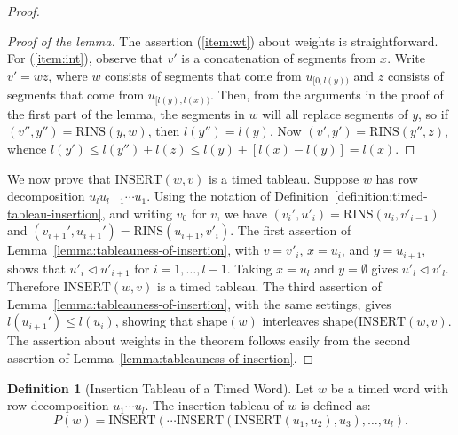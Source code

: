 \documentclass[10pt]{amsproc}
\theoremstyle{definition}
\newtheorem{definition}[theorem]{Definition}
\theoremstyle{remark}
\newcommand{\rowins}{\mathrm{RINS}}
\newcommand{\ins}{\mathrm{INSERT}}
\newcommand{\shape}{\mathrm{shape}}
\begin{document}
\begin{proof}
\begin{proof}[Proof of the lemma]
    The assertion (\ref{item:wt}) about weights is straightforward.
    For (\ref{item:int}), observe that $v'$ is a concatenation of segments from $x$.
    Write $v'=wz$, where $w$ consists of segments that come from $u_{[0,l(y))}$ and $z$ consists of segments that come from $u_{[l(y),l(x))}$.
    Then, from the arguments in the proof of the first part of the lemma, the segments in $w$ will all replace segments of $y$, so if $(v'',y'')=\rowins(y,w)$, then $l(y'')=l(y)$.
    Now $(v',y')=\rowins(y'',z)$, whence $l(y')\leq l(y'')+l(z)\leq l(y)+[l(x)-l(y)] = l(x)$.
  \end{proof}
  We now prove that $\ins(w,v)$ is a timed tableau.
  Suppose $w$ has row decomposition $u_lu_{l-1}\dotsb u_1$.
  Using the notation of Definition~\ref{definition:timed-tableau-insertion}, and writing $v_0$ for $v$, we have $(v_i',u'_i)=\rowins(u_i,v'_{i-1})$ and $(v_{i+1}',u_{i+1}')=\rowins(u_{i+1},v'_i)$.
  The first assertion of Lemma~\ref{lemma:tableauness-of-insertion}, with $v=v'_i$, $x=u_i$, and $y=u_{i+1}$, shows that $u'_i\lhd u'_{i+1}$ for $i=1,\dotsc,l-1$.
  Taking $x=u_l$ and $y=\emptyset$ gives $u'_l\lhd v'_l$. Therefore $\ins(w,v)$ is a timed tableau.
  The third assertion of Lemma~\ref{lemma:tableauness-of-insertion}, with the same settings, gives $l(u_{i+1}')\leq l(u_i)$, showing that $\shape(w)$ interleaves $\shape(\ins(w,v)$.
  The assertion about weights in the theorem follows easily from the second assertion of Lemma~\ref{lemma:tableauness-of-insertion}.
\end{proof}
\begin{definition}
  [Insertion Tableau of a Timed Word]
  \label{definition:insertion_tableaux}
  Let $w$ be a timed word with row decomposition $u_1\dotsb u_l$.
  The insertion tableau of $w$ is defined as:
  \begin{displaymath}
    P(w) = \ins(\dotsb\ins(\ins(u_1, u_2),u_3),\dotsc,u_l).
  \end{displaymath}
\end{definition}
\end{document}
